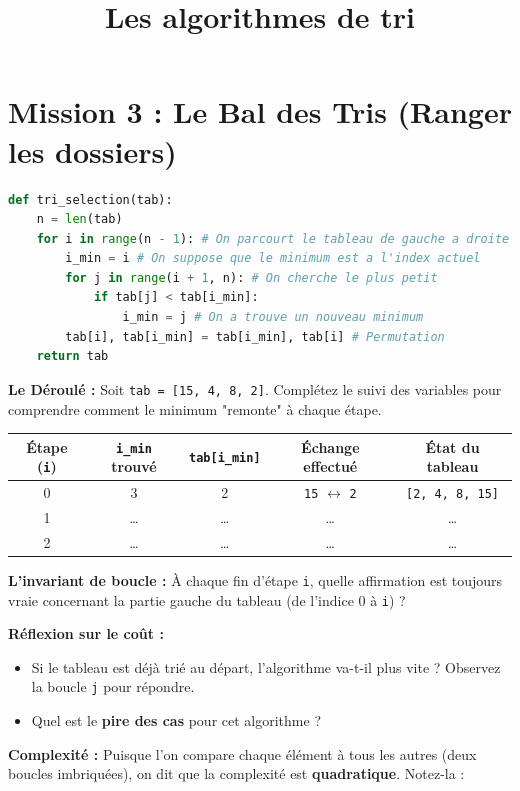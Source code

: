 \documentclass[12pt,a4paper]{report}
\title{Les algorithmes de tri}
\date{}
\begin{document}
\section*{Mission 3 : Le Bal des Tris (Ranger les dossiers) }

\begin{Comprendre}
\begin{lstlisting}[language=Python]
def tri_selection(tab):
    n = len(tab)
    for i in range(n - 1): # On parcourt le tableau de gauche a droite
        i_min = i # On suppose que le minimum est a l'index actuel
        for j in range(i + 1, n): # On cherche le plus petit
            if tab[j] < tab[i_min]:
                i_min = j # On a trouve un nouveau minimum
        tab[i], tab[i_min] = tab[i_min], tab[i] # Permutation
    return tab      
\end{lstlisting}
\begin{center}
    
\end{center}
\end{Comprendre}

\begin{Exercise}[title={Analyse du Tri par Sélection }]
    \Question \textbf{Le Déroulé :} Soit \texttt{tab = [15, 4, 8, 2]}. Complétez le suivi des variables pour comprendre comment le minimum "remonte" à chaque étape.
    \begin{center}
    \begin{tabular}{|c|c|c|c|c|}
    \hline
    Étape (\texttt{i}) & \texttt{i\_min} trouvé & \texttt{tab[i\_min]} & Échange effectué & État du tableau \\ \hline
    0 & 3 & 2 & \texttt{15} $\leftrightarrow$ \texttt{2} & \texttt{[2, 4, 8, 15]} \\ \hline
    1 & \dots & \dots & \dots & \dots \\ \hline
    2 & \dots & \dots & \dots & \dots \\ \hline
    \end{tabular}
    \end{center}

    \Question \textbf{L'invariant de boucle :} À chaque fin d'étape \texttt{i}, quelle affirmation est toujours vraie concernant la partie gauche du tableau (de l'indice 0 à \texttt{i}) ? \dotfill

    \Question \textbf{Réflexion sur le coût :} 
    \begin{itemize}
        \item Si le tableau est déjà trié au départ, l'algorithme va-t-il plus vite ? Observez la boucle \texttt{j} pour répondre. \dotfill
        \item Quel est le \textbf{pire des cas} pour cet algorithme ? \dotfill
    \end{itemize}
    \Question \textbf{Complexité :} Puisque l'on compare chaque élément à tous les autres (deux boucles imbriquées), on dit que la complexité est \textbf{quadratique}. Notez-la : \dotfill
\end{Exercise}
\end{document}
